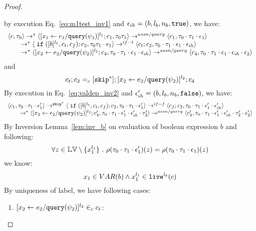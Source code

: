 \begin{proof}
\begin{case}
\begin{subcase}
\begin{subsubcase}
\begin{subproof}
by execution Eq.~\ref{eq:m1test_inv1} and $\mathtt{\epsilon}_{ih} = (b, l_b, n_b, \mathtt{true})$, we have:
\[
  \begin{array}{l}   
  \langle {c}, \mathtt{\tau}_0 \rangle \rightarrow^{*} 
  \langle [\mathrel{ {x}_1 \leftarrow e_1 / {\tt query}(\psi_1) }]^{l_1} ; {c}_1, \mathtt{\tau}_0 \mathtt{\tau}_1 \rangle  
  \rightarrow^{assn/query}
  \langle c_1, \mathtt{\tau}_0 \cdot \mathtt{\tau}_1 \cdot \mathtt{\epsilon}_1 \rangle 
  \\
  \qquad \rightarrow^{*} 
  \langle \;\mathtt{if}\; ([b]^{l_b}, c_t, c_f);{c}_2, \mathtt{\tau}_0 \mathtt{\tau}_1 \cdot \mathtt{\epsilon}_1 \rangle 
  \rightarrow^{if-t} 
  \langle c_t;c_2, \mathtt{\tau}_0 \cdot \mathtt{\tau}_1 \cdot \mathtt{\epsilon}_1 \cdot \mathtt{\epsilon}_{ih} \rangle 
  \\
  \qquad \rightarrow^{*} 
  \langle [\mathrel{ {x}_2 \leftarrow e_2 / {\tt query}(\psi_2) }]^{l_2};{c}_4, 
  \mathtt{\tau}_0 \cdot \mathtt{\tau}_1 \cdot \mathtt{\epsilon}_1 \cdot \mathtt{\epsilon}_{ih} \rangle 
  \rightarrow^{assn/query} 
  \langle {c}_4,  \mathtt{\tau}_0 \cdot \mathtt{\tau}_1 \cdot \mathtt{\epsilon}_1 \cdot \mathtt{\epsilon}_{ih} \cdot \mathtt{\epsilon}_2 \rangle 
  \end{array}
\]
and 
\[
  c_t;c_2 =_c [\mathtt{skip}^*]; [\mathrel{ {x}_2 \leftarrow e_2 / {\tt query}(\psi_2) }]^{l_2};{c}_4
\]
%
By execution in Eq.~\ref{eq:valdep_inv2} and $\mathtt{\epsilon}_{ih}' = (b, l_b, n_b, \mathtt{false})$, we have:
\begin{equation}
\label{eq:m1testif_inv2}
  \begin{array}{l}   
  \langle c_1, \mathtt{\tau}_0 \cdot \mathtt{\tau}_1 \cdot \mathtt{\epsilon}_1' \rangle 
  \rightarrow^{\mathtt{skip}^*} 
  \langle \;\mathtt{if}\; ([b]^{l_b}, c_t, c_f); {c}_2, \mathtt{\tau}_0 \cdot \mathtt{\tau}_1 \cdot \mathtt{\epsilon}_1' \rangle 
  \rightarrow^{if-f} 
  \langle c_f;c_2, \mathtt{\tau}_0 \cdot \mathtt{\tau}_1 \cdot \mathtt{\epsilon}_1' \cdot \mathtt{\epsilon}_{ih}' \rangle 
  \\
  \qquad \rightarrow^{*} 
  \langle [\mathrel{ {x}_2 \leftarrow e_2 / {\tt query}(\psi_2) }]^{l_2};{c}_4', 
  \mathtt{\tau}_0 \cdot \mathtt{\tau}_1 \cdot \mathtt{\epsilon}_1' \cdot \mathtt{\epsilon}_{ih}' \cdot \mathtt{\tau}_2' \rangle
  \rightarrow^{assn/query} 
  \langle {c}_4',  \mathtt{\tau}_0 \cdot \mathtt{\tau}_1 \cdot \mathtt{\epsilon}_1' \cdot \mathtt{\epsilon}_{ih}' \cdot \mathtt{\tau}_2' \cdot \mathtt{\epsilon}_2' \rangle 
\end{array}
\end{equation}
By Inversion Lemma~\ref{lem:inv_b} on evaluation of boolean expression $b$ and following: 
\[
  \forall z \in \mathbb{LV} \setminus \{x_1^{l_1}\} ~.~
  \rho(\mathtt{\tau}_0 \cdot \mathtt{\tau}_1 \cdot \mathtt{\epsilon}_1')(z) = \rho(\mathtt{\tau}_0 \cdot \mathtt{\tau}_1 \cdot \mathtt{\epsilon}_1)(z)
\]
we know:
\[
  x_1 \in VAR(b) \land x_1^{l_1} \in \mathtt{live}^{l_b}(c)
\]
%
 By uniqueness of label, we have following cases:
 \begin{enumerate}
 \item $[\mathrel{ {x}_2 \leftarrow e_2 / {\tt query}(\psi_2) }]^{l_2} \in_c c_t$:

\end{enumerate}
\end{subproof}
\end{subsubcase}
\end{subcase}
\end{case}
\end{proof}

